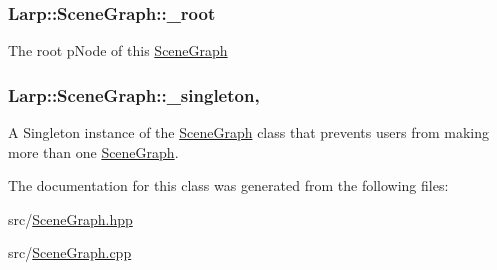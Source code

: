 \subsubsection[{\texorpdfstring{\+\_\+root}{_root}}]{ Larp\+::\+Scene\+Graph\+::\+\_\+root\hspace{0.3cm}{\ttfamily [private]}}\hypertarget{classLarp_1_1SceneGraph_adf33065344039fd7fce5f828e800137f}{}\label{classLarp_1_1SceneGraph_adf33065344039fd7fce5f828e800137f}
The root p\+Node of this \hyperlink{classLarp_1_1SceneGraph}{Scene\+Graph} 
\subsubsection[{\texorpdfstring{\+\_\+singleton}{_singleton}}]{ Larp\+::\+Scene\+Graph\+::\+\_\+singleton\hspace{0.3cm}{\ttfamily [static]}, {\ttfamily [private]}}\hypertarget{classLarp_1_1SceneGraph_a7e022917365e62f172efa60d7addd242}{}\label{classLarp_1_1SceneGraph_a7e022917365e62f172efa60d7addd242}
A Singleton instance of the \hyperlink{classLarp_1_1SceneGraph}{Scene\+Graph} class that prevents users from making more than one \hyperlink{classLarp_1_1SceneGraph}{Scene\+Graph}. 

The documentation for this class was generated from the following files\+:\begin{DoxyCompactItemize}
\item 
src/\hyperlink{SceneGraph_8hpp}{Scene\+Graph.\+hpp}\item 
src/\hyperlink{SceneGraph_8cpp}{Scene\+Graph.\+cpp}\end{DoxyCompactItemize}
